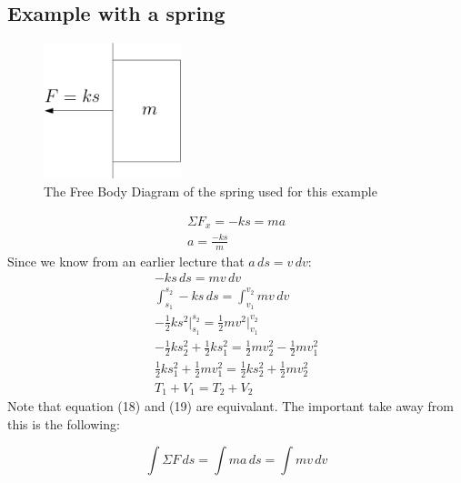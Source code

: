 \documentclass[11pt, a4paper]{article}
\begin{document}
\subsection{Example with a spring}
\begin{figure}[h]
  \centerline{\includegraphics[width=40mm]{images/Spring.png}}
  \caption{The Free Body Diagram of the spring used for this example}
\end{figure}
\begin{gather}
  \Sigma F_x = -ks = ma\\
  a = \frac{-ks}{m}
\end{gather}
Since we know from an earlier lecture that $a\,ds = v\,dv$:
\begin{gather}
  -ks\,ds = mv\,dv\\
  \int_{s_1}^{s_2}-ks\,ds = \int_{v_1}^{v_2}mv\,dv\\
  -\frac{1}{2}ks^2 \Big|_{s_1}^{s_2} = \frac{1}{2}mv^2 \Big|_{v_1}^{v_2}\\
  -\frac{1}{2}ks_2^2 + \frac{1}{2}ks_1^2 = \frac{1}{2}mv_2^2 - \frac{1}{2}mv_1^2\\
  \frac{1}{2}ks_1^2 + \frac{1}{2}mv_1^2 = \frac{1}{2}ks_2^2 + \frac{1}{2}mv_2^2 \\
  T_1 + V_1 = T_2 + V_2
\end{gather}
Note that equation (18) and (19) are equivalant.
The important take away from this is the following:

\begin{equation}
  \int \Sigma F\,ds = \int ma\,ds = \int mv\,dv
\end{equation}
\end{document}
